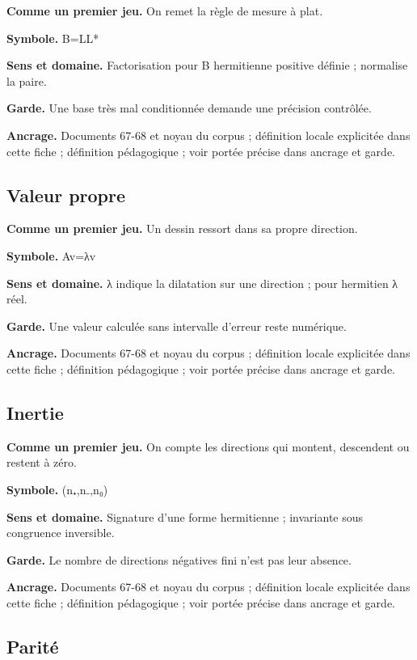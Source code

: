 \documentclass[
  9pt,
  a4paper,
]{article}
\begin{document}
\textbf{Comme un premier jeu.} On remet la règle de mesure à plat.

\textbf{Symbole.} B=LL*

\textbf{Sens et domaine.} Factorisation pour B hermitienne positive
définie ; normalise la paire.

\textbf{Garde.} Une base très mal conditionnée demande une précision
contrôlée.

\textbf{Ancrage.} Documents 67-68 et noyau du corpus ; définition locale
explicitée dans cette fiche ; définition pédagogique ; voir portée
précise dans ancrage et garde.

\hypertarget{valeur-propre}{%
\subsection{Valeur propre}\label{valeur-propre}}

\textbf{Comme un premier jeu.} Un dessin ressort dans sa propre
direction.

\textbf{Symbole.} Av=λv

\textbf{Sens et domaine.} λ indique la dilatation sur une direction ;
pour hermitien λ réel.

\textbf{Garde.} Une valeur calculée sans intervalle d'erreur reste
numérique.

\textbf{Ancrage.} Documents 67-68 et noyau du corpus ; définition locale
explicitée dans cette fiche ; définition pédagogique ; voir portée
précise dans ancrage et garde.

\hypertarget{inertie}{%
\subsection{Inertie}\label{inertie}}

\textbf{Comme un premier jeu.} On compte les directions qui montent,
descendent ou restent à zéro.

\textbf{Symbole.} (n₊,n₋,n₀)

\textbf{Sens et domaine.} Signature d'une forme hermitienne ; invariante
sous congruence inversible.

\textbf{Garde.} Le nombre de directions négatives fini n'est pas leur
absence.

\textbf{Ancrage.} Documents 67-68 et noyau du corpus ; définition locale
explicitée dans cette fiche ; définition pédagogique ; voir portée
précise dans ancrage et garde.

\hypertarget{parituxe9}{%
\subsection{Parité}\label{parituxe9}}
\end{document}
